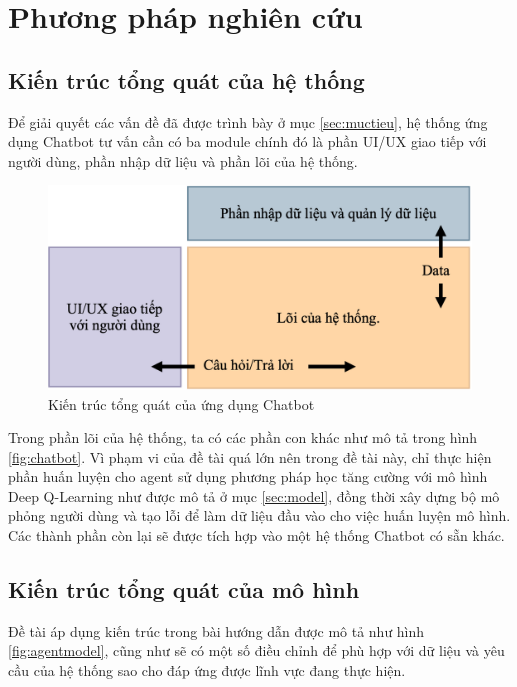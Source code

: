 \chapter{Phương pháp nghiên cứu}

\section{Kiến trúc tổng quát của hệ thống}
Để giải quyết các vấn đề đã được trình bày ở mục \ref{sec:muctieu},
hệ thống ứng dụng Chatbot tư vấn cần có ba module chính đó là phần
UI/UX giao tiếp với người dùng, phần nhập dữ liệu và phần lõi của hệ thống.

\begin{figure}[ht]
    \centering
    \includegraphics[width=1\textwidth]{thesis/chatbot-outline/phuongphap/chatbot_app.png}
    \caption{Kiến trúc tổng quát của ứng dụng Chatbot}
    \label{fig:chatbotapp}
\end{figure}

Trong phần lõi của hệ thống, ta có các phần con khác như mô tả
trong hình \ref{fig:chatbot}. Vì phạm vi của đề tài quá lớn nên
trong đề tài này, chỉ thực hiện phần huấn luyện cho agent sử dụng
phương pháp học tăng cường với mô hình Deep Q-Learning như được
mô tả ở mục \ref{sec:model}, đồng thời xây dựng bộ mô phỏng người dùng
và tạo lỗi để làm dữ liệu đầu vào cho việc huấn luyện mô hình.
Các thành phần còn lại sẽ được tích hợp vào một hệ thống Chatbot
có sẵn khác.

\section{Kiến trúc tổng quát của mô hình}
Đề tài áp dụng kiến trúc trong bài hướng dẫn \cite{traininggochatbot}
được mô tả như hình \ref{fig:agentmodel}, cũng như sẽ có một số
điều chỉnh để phù hợp với dữ liệu và yêu cầu của hệ thống sao cho
đáp ứng được lĩnh vực đang thực hiện.

